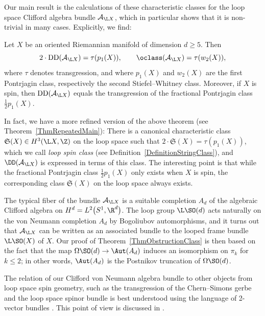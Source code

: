 Our main result is the calculations of these characteristic classes for the loop space Clifford algebra bundle $\mathcal{A}_{\L X}$, which in particular shows that it is non-trivial in many cases.
Explicitly, we find:

\begin{Maintheorem} \label{ThmObstructionClass}
Let $X$ be an oriented Riemannian manifold of dimension $d\geq 5$.
Then
\begin{equation*}
2\cdot \mathrm{DD}(\mathcal{A}_{\L X}) = \tau(p_1(X)),\qquad \oclass(\mathcal{A}_{\L X}) = \tau(w_2(X)),
\end{equation*}
where $\tau$ denotes transgression, and where $p_1(X)$ and $w_2(X)$ are the first Pontrjagin class, respectively the second Stiefel--Whitney class.
Moreover, if $X$ is spin, then $\mathrm{DD}(\mathcal{A}_{\L X})$ equals the transgression of the fractional Pontrjagin class $\frac{1}{2}p_1(X)$.
\end{Maintheorem}

In fact, we have a more refined version of the above theorem (see Theorem~\ref{ThmRepeatedMain}):
There is a canonical characteristic class $\mathfrak{S}(X) \in H^3(\L X, \Z)$ on the loop space such that $2 \cdot \mathfrak{S}(X) = \tau(p_1(X))$, which we call \emph{loop spin class} (see Definition~\ref{DefinitionStringClass}),
and $\DD(\mathcal{A}_{\L X})$ is expressed in terms of this class.
The interesting point is that while the fractional Pontrjagin class $\frac{1}{2}p_1(X)$ only exists when $X$ is spin, the corresponding class $\mathfrak{S}(X)$ on the loop space always exists.

The typical fiber of the bundle $\mathcal{A}_{\L X}$ is a suitable completion $A_d$ of the algebraic Clifford algebra on $H^d = L^2\big(S^1, \R^d\big)$.
The loop group $\L\SO(d)$ acts naturally on the von Neumann completion $A_d$ by Bogoliubov automorphisms, and it turns out that $\mathcal{A}_{\L X}$ can be written as an associated bundle to the looped frame bundle $\L\SO(X)$ of $X$.
Our proof of Theorem~\ref{ThmObstructionClass} is then based on the fact that the map $\Omega\SO(d) \to \Aut(A_d)$ induces an isomorphism on $\pi_k$ for $k \leq 2$; in other words, $\Aut(A_d)$ is the Postnikov truncation of $\Omega\SO(d)$.



The relation of our Clifford von Neumann algebra bundle to other objects from loop space spin geometry, such as the transgression of the Chern--Simons gerbe \cite{WaldorfSpinString} and the loop space spinor bundle \cite{ KristelWaldorf2, KristelWaldorf3,KristelWaldorf1} is best understood using the language of 2-vector bundles \cite{2vectorbundles}.
This point of view is discussed in \cite[Section~1]{LudewigSpinorBundle}.

